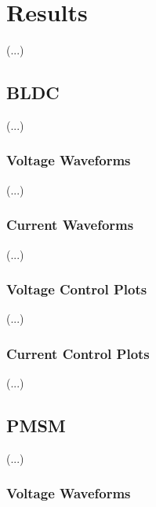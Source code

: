 \chapter{Results} \label{chap:results}

(...)\\

\lipsum[1]

\section{BLDC}

(...)\\

\lipsum[2]

\subsection{Voltage Waveforms}

(...)\\

\lipsum[3]

\subsection{Current Waveforms}

(...)\\

\lipsum[4]

\subsection{Voltage Control Plots}

(...)\\

\lipsum[5]

\subsection{Current Control Plots}

(...)\\

\lipsum[6]

\section{PMSM}

(...)\\

\lipsum[7]

\subsection{Voltage Waveforms}

